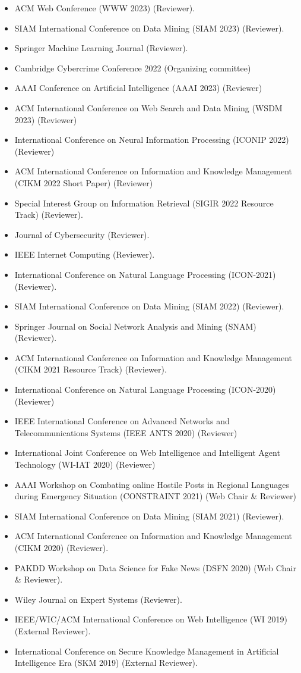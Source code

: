 \documentclass[margin, centered,lmodern]{res}
\begin{document}
\begin{resume}
\begin{itemize}[leftmargin=*]
\item ACM Web Conference (WWW 2023) (Reviewer).
\item SIAM International Conference on Data Mining (SIAM 2023) (Reviewer).
\item Springer Machine Learning Journal (Reviewer).
\item Cambridge Cybercrime Conference 2022 (Organizing committee)
\item AAAI Conference on Artificial Intelligence (AAAI 2023) (Reviewer)
\item ACM International Conference on Web Search and Data Mining (WSDM 2023) (Reviewer)
\item International Conference on Neural Information Processing (ICONIP 2022) (Reviewer)
\item ACM International Conference on Information and Knowledge Management (CIKM 2022 Short Paper) (Reviewer)
\item Special Interest Group on Information Retrieval (SIGIR 2022 Resource Track) (Reviewer).
\item Journal of Cybersecurity (Reviewer).
\item IEEE Internet Computing (Reviewer).
\item International Conference on Natural Language Processing (ICON-2021) (Reviewer).
\item SIAM International Conference on Data Mining (SIAM 2022) (Reviewer).
\item Springer Journal on Social Network Analysis and Mining (SNAM)   (Reviewer).
   \item ACM International Conference on Information and Knowledge Management (CIKM 2021 Resource Track) (Reviewer).
    \item International Conference on Natural Language Processing (ICON-2020) (Reviewer)
    \item IEEE International Conference on Advanced Networks and Telecommunications Systems (IEEE ANTS 2020) (Reviewer)
    \item International Joint Conference on Web Intelligence and Intelligent Agent Technology (WI-IAT 2020) (Reviewer)
	\item AAAI Workshop on Combating online Hostile Posts in Regional Languages during Emergency Situation (CONSTRAINT 2021) (Web Chair \& Reviewer)
	\item SIAM International Conference on Data Mining (SIAM 2021) (Reviewer).
	\item ACM International Conference on Information and Knowledge Management (CIKM 2020) (Reviewer).
	\item PAKDD Workshop on Data Science for Fake News (DSFN 2020) (Web Chair \& Reviewer).
	\item Wiley Journal on Expert Systems (Reviewer).
	\item IEEE/WIC/ACM International Conference on Web Intelligence (WI 2019) (External Reviewer).
	\item International Conference on Secure Knowledge Management in Artificial Intelligence Era (SKM 2019) (External Reviewer).
\end{itemize}


\end{resume}
\end{document}
